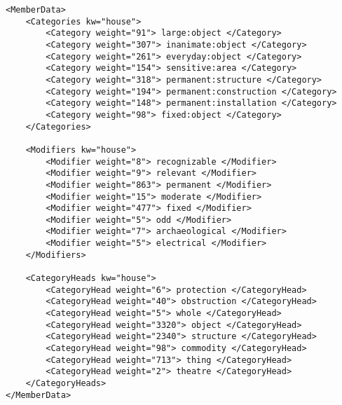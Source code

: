 \lstset{language=XML}
\begin{lstlisting}[caption= Ejemplo formatos XML Thesaurus Rex, label={lst:xmlthesaurusrex}, frame=single]
<MemberData>
	<Categories kw="house">
		<Category weight="91"> large:object </Category>
		<Category weight="307"> inanimate:object </Category>
		<Category weight="261"> everyday:object </Category>
		<Category weight="154"> sensitive:area </Category>
		<Category weight="318"> permanent:structure </Category>
		<Category weight="194"> permanent:construction </Category>
		<Category weight="148"> permanent:installation </Category>
		<Category weight="98"> fixed:object </Category>
	</Categories>
	
	<Modifiers kw="house">
		<Modifier weight="8"> recognizable </Modifier>
		<Modifier weight="9"> relevant </Modifier>
		<Modifier weight="863"> permanent </Modifier>
		<Modifier weight="15"> moderate </Modifier>
		<Modifier weight="477"> fixed </Modifier>
		<Modifier weight="5"> odd </Modifier>
		<Modifier weight="7"> archaeological </Modifier>
		<Modifier weight="5"> electrical </Modifier>
	</Modifiers>
	
	<CategoryHeads kw="house">
		<CategoryHead weight="6"> protection </CategoryHead>
		<CategoryHead weight="40"> obstruction </CategoryHead>
		<CategoryHead weight="5"> whole </CategoryHead>
		<CategoryHead weight="3320"> object </CategoryHead>
		<CategoryHead weight="2340"> structure </CategoryHead>
		<CategoryHead weight="98"> commodity </CategoryHead>
		<CategoryHead weight="713"> thing </CategoryHead>
		<CategoryHead weight="2"> theatre </CategoryHead>
	</CategoryHeads>
</MemberData>

\end{lstlisting}



